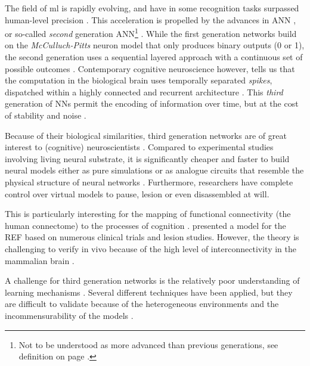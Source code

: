 \documentclass[report.tex]{subfiles}
\begin{document}
The field of \gls{ml} is rapidly evolving, and have in
some recognition tasks surpassed human-level precision
\autocite{Schmidhuber2014}.
This acceleration is propelled by the advances in \gls{ANN}
\autocite{Rumelhart1988, Schmidhuber2014, Nilsson2009}, or
so-called \textit{second} generation \gls{ANN}\footnote{Not to be 
understood as more advanced than previous generations, see definition on page
\pageref{sec:glossary}.} \cite{Maass1997}.
While the first generation networks build on the \textit{McCulluch-Pitts}
neuron model that only produces binary outputs (0 or 1), the second
generation uses a sequential layered approach with a continuous set of 
possible outcomes \cite{Maass1997, Russel2007}.
Contemporary cognitive neuroscience however, tells us that the computation
in the biological brain uses temporally separated \textit{spikes}, 
dispatched within a highly connected and recurrent architecture 
\cite{Dayan2001, Eliasmith2004}.
This \textit{third} generation of \gls{NN}s permit the encoding
of information over time, but at the cost of stability and 
noise \autocite{Maass1997}.

Because of their biological similarities, third generation 
networks are of great interest to (cognitive) neuroscientists
\autocite{Dayan2001,Bruderle2011,Eliasmith2015}.
Compared to experimental studies involving living neural substrate,
it is significantly cheaper and faster to build neural 
models either as pure simulations
\autocite{Davison2009, Eliasmith2015} or as analogue circuits
that resemble the physical structure of neural networks
\autocite{Walter2015, Schmitt2017}.
Furthermore, researchers have complete control over virtual models
to pause, lesion or even disassembled at will.

This is particularly interesting for the
mapping of functional connectivity (the human connectome) to the
processes of cognition \autocite{Eliasmith2015, Mogensen2011}. 
\textcite{Mogensen2011} presented a model for the 
\gls{REF} based on numerous clinical trials and lesion studies.
However, the theory is challenging to verify in vivo because of
the high level of interconnectivity in the mammalian brain
\autocite{Hohwy2009, Mogensen2017}.

A challenge for third generation networks is the relatively
poor understanding of learning mechanisms \autocite{Tavanei2015,
Walter2015}.
Several different techniques have been applied, but they are
difficult to validate because of the heterogeneous environments and
the incommensurability of the models \autocite{Bohte2002, Bruderle2011}.
\end{document}
